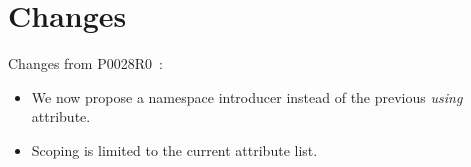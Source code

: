 \section*{Changes}

Changes from P0028R0~\cite{p0028r0}:

\begin{itemize}

\item We now propose a namespace introducer instead of the previous \emph{using} attribute.

\item Scoping is limited to the current attribute list.

\end{itemize}
